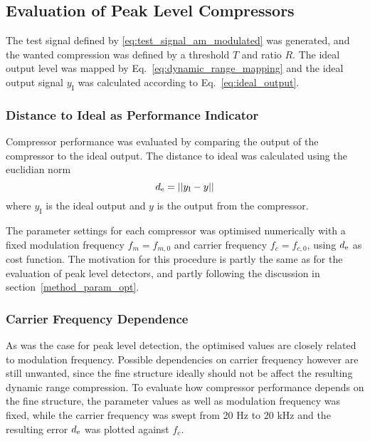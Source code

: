 \documentclass[../main2.tex]{subfiles}
\begin{document}
\subsection{Evaluation of Peak Level Compressors}\label{method_peak_compressors}
The test signal defined by \eqref{eq:test_signal_am_modulated} was generated, and the wanted compression was defined by a threshold $T$ and ratio $R$. The ideal output level was mapped by Eq.~\eqref{eq:dynamic_range_mapping} and the ideal output signal $y_\text{I}$ was calculated according to Eq.~\eqref{eq:ideal_output}.

\subsubsection{Distance to Ideal as Performance Indicator}
Compressor performance was evaluated by comparing the output of the compressor to the ideal output. The distance to ideal was calculated using the euclidian norm
\begin{equation}
d_\text{e} = ||y_\text{I} - y||
\end{equation}
where $y_\text{I}$ is the ideal output and $y$ is the output from the compressor.

The parameter settings for each compressor was optimised numerically with a fixed modulation frequency $f_m = f_{m,0}$ and carrier frequency $f_c = f_{c,0}$, using $d_\text{e}$ as cost function. The motivation for this procedure is partly the same as for the evaluation of peak level detectors, and partly following the discussion in section~\ref{method_param_opt}.

\subsubsection{Carrier Frequency Dependence}
As was the case for peak level detection, the optimised values are closely related to modulation frequency. Possible dependencies on carrier frequency however are still unwanted, since the fine structure ideally should not be affect the resulting dynamic range compression. To evaluate how compressor performance depends on the fine structure, the parameter values as well as modulation frequency was fixed, while the carrier frequency was swept from 20 Hz to 20 kHz and the resulting error $d_\text{e}$ was plotted against $f_c$.
\end{document}
